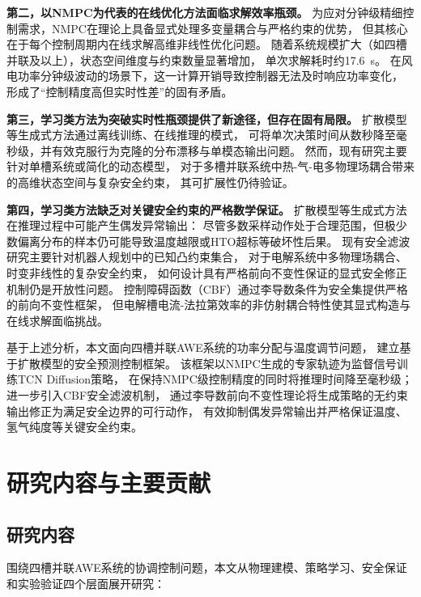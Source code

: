 \textbf{第二，以NMPC为代表的在线优化方法面临求解效率瓶颈。}
为应对分钟级精细控制需求，NMPC在理论上具备显式处理多变量耦合与严格约束的优势，
但其核心在于每个控制周期内在线求解高维非线性优化问题。
随着系统规模扩大（如四槽并联及以上），状态空间维度与约束数量显著增加，
单次求解耗时约17.6~s。
在风电功率分钟级波动的场景下，这一计算开销导致控制器无法及时响应功率变化，
形成了``控制精度高但实时性差''的固有矛盾。

\textbf{第三，学习类方法为突破实时性瓶颈提供了新途径，但存在固有局限。}
扩散模型等生成式方法通过离线训练、在线推理的模式，
可将单次决策时间从数秒降至毫秒级，并有效克服行为克隆的分布漂移与单模态输出问题。
然而，现有研究主要针对单槽系统或简化的动态模型，
对于多槽并联系统中热-气-电多物理场耦合带来的高维状态空间与复杂安全约束，
其可扩展性仍待验证。

\textbf{第四，学习类方法缺乏对关键安全约束的严格数学保证。}
扩散模型等生成式方法在推理过程中可能产生偶发异常输出：
尽管多数采样动作处于合理范围，但极少数偏离分布的样本仍可能导致温度越限或HTO超标等破坏性后果。
现有安全滤波研究主要针对机器人规划中的已知凸约束集合，
对于电解系统中多物理场耦合、时变非线性的复杂安全约束，
如何设计具有严格前向不变性保证的显式安全修正机制仍是开放性问题。
控制障碍函数（CBF）通过李导数条件为安全集提供严格的前向不变性框架，
但电解槽电流-法拉第效率的非仿射耦合特性使其显式构造与在线求解面临挑战。

基于上述分析，本文面向四槽并联AWE系统的功率分配与温度调节问题，
建立基于扩散模型的安全预测控制框架。
该框架以NMPC生成的专家轨迹为监督信号训练TCN Diffusion策略，
在保持NMPC级控制精度的同时将推理时间降至毫秒级；
进一步引入CBF安全滤波机制，
通过李导数前向不变性理论将生成策略的无约束输出修正为满足安全边界的可行动作，
有效抑制偶发异常输出并严格保证温度、氢气纯度等关键安全约束。

\section{研究内容与主要贡献}

\subsection{研究内容}

围绕四槽并联AWE系统的协调控制问题，本文从物理建模、策略学习、安全保证和实验验证四个层面展开研究：

